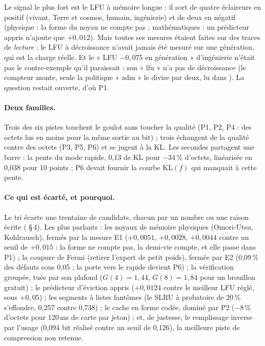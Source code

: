 Le signal le plus fort est le LFU à mémoire longue : il sort de quatre éclaireurs en positif (vivant, Terre et cosmos, humain, ingénierie) et de deux en négatif (physique : la forme du noyau ne compte pas ; mathématiques : un prédicteur appris n'ajoute que $+0{,}012$). Mais toutes ses mesures étaient faites sur des traces de \emph{lecture} : le LFU à décroissance n'avait jamais été mesuré sur une génération, qui est la charge réelle. Et le « LFU $-0{,}075$ en génération » d'ingénierie n'était pas le contre-exemple qu'il paraissait : son « lfu » n'a pas de décroissance (le compteur monte, seule la politique « adm » le divise par deux, lu dans ). La question restait ouverte, d'où P1.

\paragraph{Deux familles.} Trois des six pistes touchent le goulot sans toucher la qualité (P1, P2, P4 : des octets lus en moins pour la même sortie au bit) ; trois échangent de la qualité contre des octets (P3, P5, P6) et se jugent à la KL. Les secondes partagent une barre : la pente du mode rapide, 0,13 de KL pour $-34\,\%$ d'octets, linéarisée en 0,038 pour 10 points ; P6 devait fournir la courbe KL$(f)$ qui manquait à cette pente.

\paragraph{Ce qui est écarté, et pourquoi.} Le tri écarte une trentaine de candidats, chacun par un nombre ou une raison écrite ( §\,4). Les plus parlants : les noyaux de mémoire physiques (Omori-Utsu, Kohlrausch), fermés par la mesure E1 ($+0{,}0051$, $+0{,}0028$, $+0{,}0044$ contre un seuil de $+0{,}015$ : la forme ne compte pas, la demi-vie compte, et elle passe dans P1) ; la coupure de Fermi (retirer l'expert de petit poids), fermée par E2 (0,09\,\% des défauts sous 0,05 ; la porte vers le rapide devient P6) ; la vérification groupée, tuée par son plafond ($G(4) = 1{,}44$, $G(8) = 1{,}84$ pour un brouillon gratuit) ; le prédicteur d'éviction appris ($+0{,}0124$ contre le meilleur LFU réglé, sous $+0{,}05$) ; les segments à listes fantômes (le SLRU à probatoire de 20\,\% s'effondre, 0,257 contre 0,738) ; le cache en forme codée, dominé par P2 ($-8\,\%$ d'octets pour 120\,ms de carte par jeton) ; et, de justesse, le remplissage inverse par l'usage (0,094 bit réalisé contre un seuil de 0,126), la meilleure piste de compression non retenue.

